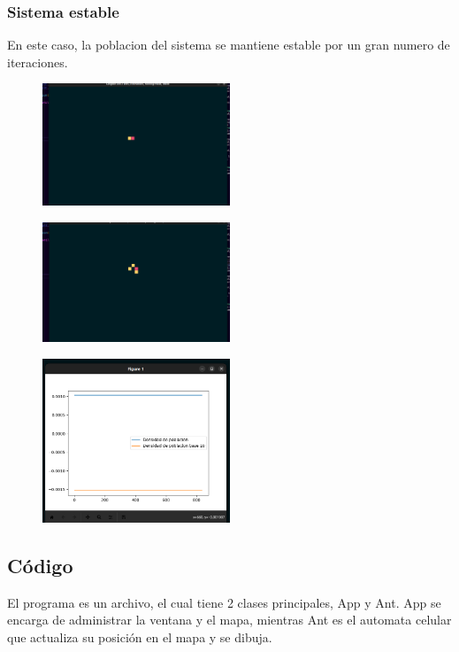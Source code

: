 \documentclass[10pt]{article}
\begin{document}
            \subsubsection{Sistema estable}
            En este caso, la poblacion del sistema se mantiene estable por un gran numero de iteraciones.
            \begin{figure}[h!]
                \centering
                \includegraphics[width=0.5\textwidth]{estable1.png}
            \end{figure}
            \begin{figure}[h!]
                \centering
                \includegraphics[width=0.5\textwidth]{estable2.png}
            \end{figure}
            \begin{figure}[h!]
                \centering
                \includegraphics[width=0.5\textwidth]{estable3.png}
            \end{figure}
        \newpage
        \subsection{Código}
            El programa es un archivo, el cual tiene 2 clases principales, App y Ant. App se encarga de administrar la ventana y el mapa, mientras Ant es el automata celular que actualiza su posición en el mapa y se dibuja.  
\end{document}
